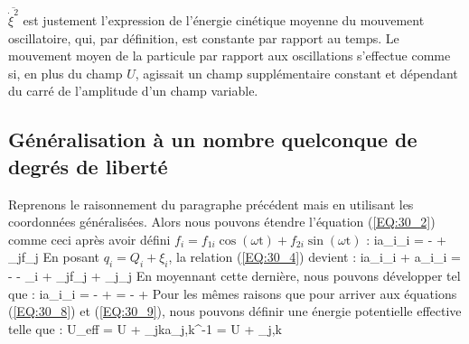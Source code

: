$\overline{\dot{\xi}^{2}}$ est justement l'expression de l'\'{e}nergie cin\'{e}tique moyenne du mouvement oscillatoire, qui, par d\'{e}finition, est constante par rapport au temps. Le mouvement moyen de la particule par rapport aux oscillations s'effectue comme si, en plus du champ $U$, agissait un champ suppl\'{e}mentaire constant et d\'{e}pendant du carr\'{e} de l'amplitude d'un champ variable.

\subsection{G\'{e}n\'{e}ralisation \`{a} un nombre quelconque de degr\'{e}s de libert\'{e}}

Reprenons le raisonnement du paragraphe pr\'{e}c\'{e}dent mais en utilisant les coordonn\'{e}es g\'{e}n\'{e}ralis\'{e}es. Alors nous pouvons \'{e}tendre l'\'{e}quation (\ref{EQ:30_2}) comme ceci apr\`{e}s avoir d\'{e}fini $f_{i} = f_{1i}\cos(\omega\mathrm{t}) + f_{2i}\sin(\omega\mathrm{t})$ :
\benn
	\forall i\text{, }a_{i}_{i} = - + \sum_{j}f_{j}
\eenn
En posant $q_{i} = Q_{i} + \xi_{i}$, la relation (\ref{EQ:30_4}) devient :
\benn
	\forall i\text{, }a_{i}_{i} + a_{i}\ddot{\xi}_{i} = - - \xi_{i} + \sum_{j}f_{j} + \sum_{j}\xi_{j}
\eenn
En moyennant cette derni\`{e}re, nous pouvons d\'{e}velopper tel que :
\benn
	\forall i\text{, }a_{i}_{i} = - +  = - + 
\eenn
Pour les m\^{e}mes raisons que pour arriver aux \'{e}quations (\ref{EQ:30_8}) et (\ref{EQ:30_9}), nous pouvons d\'{e}finir une \'{e}nergie potentielle effective telle que :
\be
	U_{eff} = U + \sum_{jk}a_{j,k}^{-1} = U + \sum_{j,k} \label{EQ:30_10}
\ee

